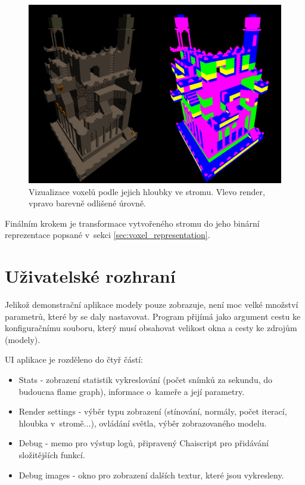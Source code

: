 \begin{figure}[H]
	\centering
	\includegraphics[scale=0.8]{obrazky-figures/levels_render.png}
	\caption{Vizualizace voxelů podle jejich hloubky ve stromu. Vlevo render, vpravo barevně odlišené úrovně.}
	\label{fig:imgui_classes}
\end{figure}



Finálním krokem je transformace vytvořeného stromu do jeho binární reprezentace popsané v~sekci \ref{sec:voxel_representation}.


\section{Uživatelské rozhraní}
Jelikož demonstrační aplikace modely pouze zobrazuje, není moc velké množství parametrů, které by se daly nastavovat. Program přijímá jako argument cestu ke konfiguračnímu souboru, který musí obsahovat velikost okna a cesty ke zdrojům (modely).

UI aplikace je rozděleno do čtyř částí:

\begin{itemize}
	\item Stats - zobrazení statistik vykreslování (počet snímků za sekundu, do budoucna flame graph), informace o~kameře a její parametry.
	\item Render settings - výběr typu zobrazení (stínování, normály, počet iterací, hloubka v~stromě...), ovládání světla, výběr zobrazovaného modelu.
	\item Debug - memo pro výstup logů, připravený Chaiscript pro přidávání složitějších funkcí.
	\item Debug images - okno pro zobrazení dalších textur, které jsou vykresleny.
\end{itemize}

